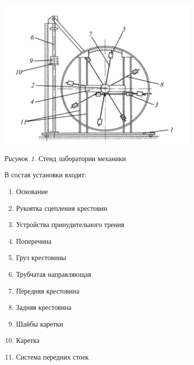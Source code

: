 \hypertarget{schema1}{}

\begin{center}
    \includegraphics[width=10cm]{images/schema1}

    \smallvspace

    \textit{Рисунок 1.} Стенд лаборатории механики

\end{center}


В состав установки входят:

\begin{enumerate}
    \item Основание

    \item Рукоятка сцепления крестовин

    \item Устройства принудительного трения

    \item Поперечина

    \item Груз крестовины

    \item Трубчатая направляющая

    \item Передняя крестовина

    \item Задняя крестовина

    \item Шайбы каретки

    \item Каретка

    \item Система передних стоек
\end{enumerate}




